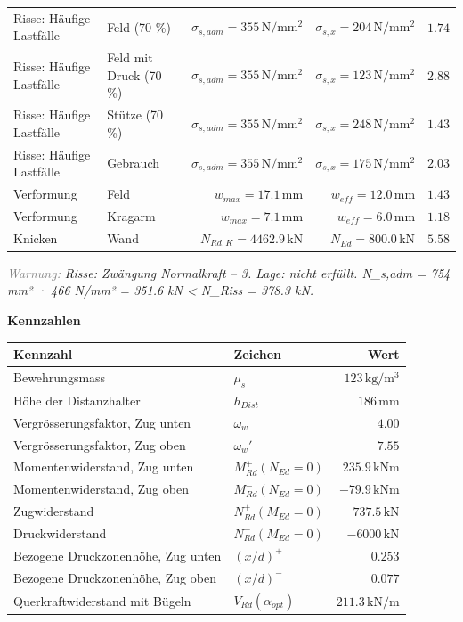 \documentclass[11pt,a4paper]{article}
\newcommand{\hinweis}[2]{\par\noindent\textcolor{gray}{\textit{#1:}} \textit{#2}\par}
\begin{document}
\begin{xltabular}{\linewidth}{>{\raggedright\arraybackslash}X>{\raggedright\arraybackslash}Xrrr}
Risse: Häufige Lastfälle & Feld (70 \%) & $\sigma_{s,adm} = 355\,\mathrm{N}/\mathrm{mm}^{2}$ & $\sigma_{s,x} = 204\,\mathrm{N}/\mathrm{mm}^{2}$ & $1.74$ \\
Risse: Häufige Lastfälle & Feld mit Druck (70 \%) & $\sigma_{s,adm} = 355\,\mathrm{N}/\mathrm{mm}^{2}$ & $\sigma_{s,x} = 123\,\mathrm{N}/\mathrm{mm}^{2}$ & $2.88$ \\
Risse: Häufige Lastfälle & Stütze (70 \%) & $\sigma_{s,adm} = 355\,\mathrm{N}/\mathrm{mm}^{2}$ & $\sigma_{s,x} = 248\,\mathrm{N}/\mathrm{mm}^{2}$ & $1.43$ \\
Risse: Häufige Lastfälle & Gebrauch & $\sigma_{s,adm} = 355\,\mathrm{N}/\mathrm{mm}^{2}$ & $\sigma_{s,x} = 175\,\mathrm{N}/\mathrm{mm}^{2}$ & $2.03$ \\
Verformung & Feld & $w_{max} = 17.1\,\mathrm{mm}$ & $w_{eff} = 12.0\,\mathrm{mm}$ & $1.43$ \\
Verformung & Kragarm & $w_{max} = 7.1\,\mathrm{mm}$ & $w_{eff} = 6.0\,\mathrm{mm}$ & $1.18$ \\
Knicken & Wand & $N_{Rd,K} = 4462.9\,\mathrm{kN}$ & $N_{Ed} = 800.0\,\mathrm{kN}$ & $5.58$ \\
\hline
\end{xltabular}
\hinweis{Warnung}{Risse: Zwängung Normalkraft – 3. Lage: nicht erfüllt. N\_s,adm = 754 mm² · 466 N/mm² = 351.6 kN < N\_Riss = 378.3 kN.}
\noindent\textbf{Kennzahlen}
\begin{longtable}{llr}
\hline
Kennzahl & Zeichen & Wert \\
\hline
\endhead
Bewehrungsmass & $\mu_s$ & $123\,\mathrm{kg}/\mathrm{m}^{3}$ \\
Höhe der Distanzhalter & $h_{Dist}$ & $186\,\mathrm{mm}$ \\
Vergrösserungsfaktor, Zug unten & $\omega_w$ & $4.00$ \\
Vergrösserungsfaktor, Zug oben & $\omega_w'$ & $7.55$ \\
Momentenwiderstand, Zug unten & $M_{Rd}^{+}(N_{Ed} = 0)$ & $235.9\,\mathrm{kNm}$ \\
Momentenwiderstand, Zug oben & $M_{Rd}^{-}(N_{Ed} = 0)$ & $-79.9\,\mathrm{kNm}$ \\
Zugwiderstand & $N_{Rd}^{+}(M_{Ed} = 0)$ & $737.5\,\mathrm{kN}$ \\
Druckwiderstand & $N_{Rd}^{-}(M_{Ed} = 0)$ & $-6000\,\mathrm{kN}$ \\
Bezogene Druckzonenhöhe, Zug unten & $\left(x/d\right)^{+}$ & $0.253$ \\
Bezogene Druckzonenhöhe, Zug oben & $\left(x/d\right)^{-}$ & $0.077$ \\
Querkraftwiderstand mit Bügeln & $V_{Rd}(\alpha_{opt})$ & $211.3\,\mathrm{kN}/\mathrm{m}$ \\
\hline
\end{longtable}
\end{document}
